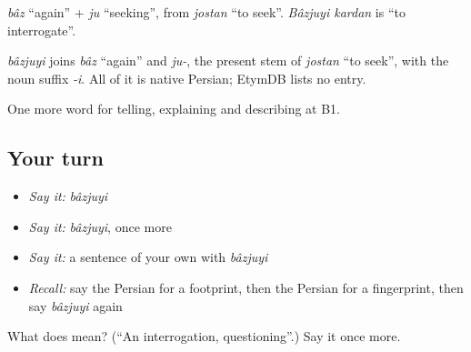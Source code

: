 \emph{bâz} \textquotedblleft{}again\textquotedblright{} + \emph{ju} \textquotedblleft{}seeking\textquotedblright{}, from \emph{jostan} \textquotedblleft{}to seek\textquotedblright{}. \emph{Bâzjuyi kardan} is \textquotedblleft{}to interrogate\textquotedblright{}.

\begin{cousinweb}
\emph{bâzjuyi} joins \emph{bâz} \textquotedblleft{}again\textquotedblright{} and \emph{ju-}, the present stem of \emph{jostan} \textquotedblleft{}to seek\textquotedblright{}, with the noun suffix \emph{-i}. All of it is native Persian; EtymDB lists no entry.
\end{cousinweb}

\begin{grammarlens}[title={What you've built}]
One more word for telling, explaining and describing at B1.
\end{grammarlens}

\subsection*{Your turn}
\begin{itemize}
\raggedright
  \item \emph{Say it:} \emph{bâzjuyi}
  \item \emph{Say it:} \emph{bâzjuyi}, once more
  \item \emph{Say it:} a sentence of your own with \emph{bâzjuyi}
  \item \emph{Recall:} say the Persian for a footprint, then the Persian for a fingerprint, then say \emph{bâzjuyi} again
\end{itemize}

\begin{tcolorbox}[breakable,colback=teal!4,colframe=teal!35!black,title={Before you move on}]
What does  mean? (\textquotedblleft{}An interrogation, questioning\textquotedblright{}.) Say it once more.
\end{tcolorbox}
